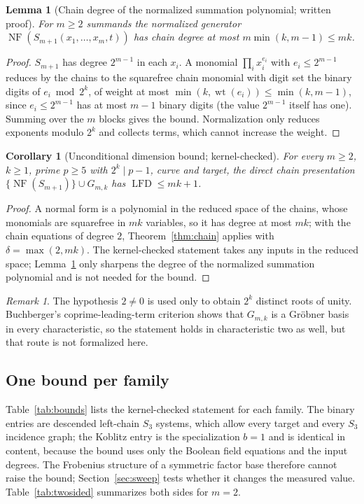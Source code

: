\documentclass[11pt]{article}
\newtheorem{lemma}[theorem]{Lemma}
\newtheorem{corollary}[theorem]{Corollary}
\theoremstyle{definition}\newtheorem{definition}[theorem]{Definition}
\theoremstyle{remark}\newtheorem{remark}[theorem]{Remark}
\newcommand{\lfd}{\operatorname{LFD}}
\newcommand{\NF}{\operatorname{NF}}
\newcommand{\wt}{\operatorname{wt}}
\begin{document}
\begin{lemma}[Chain degree of the normalized summation polynomial; written proof]\label{lem:degree}
For $m\ge2$ summands the normalized generator $\NF(S_{m+1}(x_1,\ldots,x_m,t))$
has chain degree at most $m\min(k,m-1)\le mk$.
\end{lemma}
\begin{proof}
$S_{m+1}$ has degree $2^{m-1}$ in each $x_i$. A monomial
$\prod_i x_i^{e_i}$ with $e_i\le2^{m-1}$ reduces by the chains to the
squarefree chain monomial with digit set the binary digits of
$e_i\bmod2^k$, of weight at most $\min(k,\wt(e_i))\le\min(k,m-1)$, since
$e_i\le2^{m-1}$ has at most $m-1$ binary digits (the value $2^{m-1}$ itself
has one). Summing over the $m$ blocks gives the bound. Normalization only
reduces exponents modulo $2^k$ and collects terms, which cannot increase
the weight.
\end{proof}

\begin{corollary}[Unconditional dimension bound; kernel-checked]\label{cor:allm}
For every $m\ge2$, $k\ge1$, prime $p\ge5$ with $2^k\mid p-1$, curve and
target, the direct chain presentation
$\{\NF(S_{m+1})\}\cup G_{m,k}$ has $\lfd\le mk+1$.
\end{corollary}
\begin{proof}
A normal form is a polynomial in the reduced space of the chains, whose
monomials are squarefree in $mk$ variables, so it has degree at most $mk$;
with the chain equations of degree $2$, Theorem~\ref{thm:chain} applies with
$\delta=\max(2,mk)$. The kernel-checked statement takes any inputs in the
reduced space; Lemma~\ref{lem:degree} only sharpens the degree of the
normalized summation polynomial and is not needed for the bound.
\end{proof}

\begin{remark}
The hypothesis $2\ne0$ is used only to obtain $2^k$ distinct roots of unity.
Buchberger's coprime-leading-term criterion shows that $G_{m,k}$ is a
Gr\"obner basis in every characteristic, so the statement holds in
characteristic two as well, but that route is not formalized here.
\end{remark}

\subsection{One bound per family}\label{sec:unified}
Table~\ref{tab:bounds} lists the kernel-checked statement for each family.
The binary entries are descended left-chain $S_3$ systems, which allow every
target and every $S_3$ incidence graph; the Koblitz entry is the
specialization $b=1$ and is identical in content, because the bound uses
only the Boolean field equations and the input degrees. The Frobenius
structure of a symmetric factor base therefore cannot raise the bound;
Section~\ref{sec:sweep} tests whether it changes the measured value.
Table~\ref{tab:twosided} summarizes both sides for $m=2$.
\end{document}

